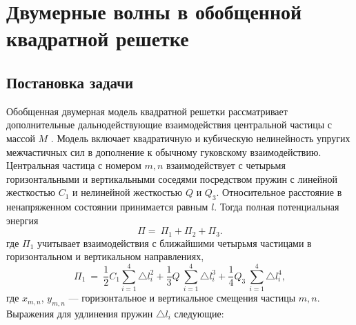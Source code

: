 \section{Двумерные волны в обобщенной квадратной решетке}
	
\subsection{Постановка задачи}
	
Обобщенная двумерная модель квадратной решетки рассматривает дополнительные дальнодействующие взаимодействия центральной частицы с массой $M$ \cite{porkros}. Модель включает квадратичную и кубическую нелинейность упругих межчастичных сил в дополнение к обычному гуковскому взаимодействию.
Центральная частица с номером ${m, n}$ взаимодействует с четырьмя горизонтальными и вертикальными соседями посредством пружин с линейной жесткостью $C_1$ и нелинейной жесткостью $Q$ и $Q_3$. Относительное расстояние в ненапряженном состоянии принимается равным $l$. 
Тогда полная потенциальная энергия
\[
\Pi=~\Pi_1+\Pi_2+\Pi_3.
\]
где $\Pi_1 $ учитывает взаимодействия с ближайшими четырьмя частицами в горизонтальном и вертикальном направлениях,
\[
\Pi_1~=~\frac{1}{2} C_1 \sum_{i=1}^{4}\triangle l_i^2+\frac{1}{3} Q~ \sum_{i=1}^{4}\triangle l_i^3+\frac{1}{4} Q_3~ \sum_{i=1}^{4}\triangle l_i^4,
\]
где $x_{m, n}$, $y_{m, n} $ --- горизонтальное и вертикальное смещения частицы $m, n$. Выражения для удлинения пружин $\triangle l_i$ следующие: \cite {porkros}
